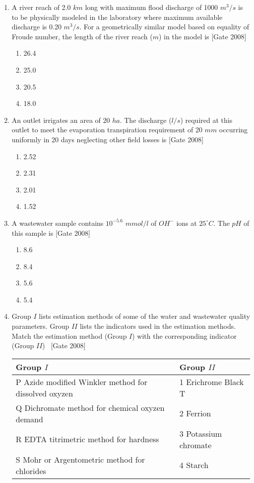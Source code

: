 \documentclass[journal]{IEEEtran}
\begin{document}
\begin{enumerate}
	\item A river reach of 2.0 $km$ long with maximum flood discharge of 1000 $m^3/s$ is to be physically modeled in the laboratory where maximum available discharge is 0.20 $m^3/s$. For 
a geometrically similar model based on equality of Froude number, the length of the river reach ($m$) in the model is  \hfill [Gate 2008]
\begin{multicols}{4}
	\begin{enumerate}
		\item 26.4
		\item 25.0
		\item 20.5
		\item 18.0
	\end{enumerate}
\end{multicols}
	\item An outlet irrigates an area of $20$ $ha$. The discharge ($l/s$) required at this outlet to meet the evaporation transpiration requirement of 20 $mm$ occurring uniformly in 20 days neglecting other field losses is  \hfill [Gate 2008]
		\begin{multicols}{4}
	\begin{enumerate}
		\item 2.52
		\item 2.31
		\item 2.01
		\item 1.52
	\end{enumerate}
\end{multicols}
	\item A wastewater sample contains $10^{-5.6}$ $mmol/l$ of $OH^{-}$ ions at $25 ^{\circ}C$. The $pH$ of this sample is
		 \hfill [Gate 2008]
		\begin{multicols}{4}
	\begin{enumerate}
		\item 8.6
		\item 8.4
		\item 5.6
		\item 5.4
	\end{enumerate}
\end{multicols}
	\item Group $I$ lists estimation methods of some of the water and wastewater quality parameters. Group $II$ lists the indicators used in the estimation methods. Match the estimation method (Group $I$) with the corresponding indicator (Group $II$) \ \hfill [Gate 2008]
\begin{center}
		
\begin{tabular}{ |l| l|}
\hline
Group $I$ &  Group $II$ \\ 
\hline
P Azide modified Winkler method for dissolved oxyzen & 1 Erichrome Black T \\
\hline
Q Dichromate method for chemical oxyzen demand & 2 Ferrion \\
\hline
R EDTA titrimetric method for hardness & 3 Potassium chromate  \\
\hline
S Mohr or Argentometric method for chlorides &  4 Starch \\
\hline



\end{tabular}
\end{center}
\end{enumerate}
\end{document}
